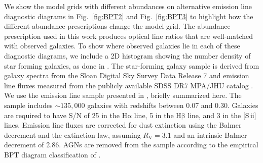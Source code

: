 \documentclass[preprint2]{aastex61}
\newcommand{\sii}{[S\,{\sc ii}]\xspace}
\newcommand{\ha}{\ensuremath{\mathrm{H\alpha}}\xspace}
\newcommand{\hb}{\ensuremath{\mathrm{H\beta}}\xspace}
\begin{document}
We show the model grids with different abundances on alternative emission line diagnostic diagrams in Fig.~\ref{fig:BPT2} and Fig.~\ref{fig:BPT3} to highlight how the different abundance prescriptions change the model grid. The abundance prescription used in this work produces optical line ratios that are well-matched with observed galaxies. To show where observed galaxies lie in each of these diagnostic diagrams, we include a 2D histogram showing the number density of star forming galaxies, as done in \citet{Byler+2016}. The star-forming galaxy sample is derived from galaxy spectra from the Sloan Digital Sky Survey Data Release 7 \citep[SDSS DR7;][]{York+2000, Abazajian+2009} and emission line fluxes measured from the publicly available SDSS DR7 MPA/JHU catalog \citep{Kauffmann+2003a, Brinchmann+2004, Salim+2007}. We use the emission line sample presented in \citet{Telford+2016}, briefly summarized here. The sample includes $\sim 135,000$ galaxies with redshifts between 0.07 and 0.30. Galaxies are required to have S/N of 25 in the \ha{} line, 5 in the \hb{} line, and 3 in the \sii{} lines. Emission line fluxes are corrected for dust extinction using the Balmer decrement and the \citet{Cardelli+1989} extinction law, assuming $R_{\mathrm{V}} = 3.1$ and an intrinsic Balmer decrement of 2.86. AGNs are removed from the sample according to the empirical BPT diagram classification of \citet{Kauffmann+2003b}.
\end{document}

